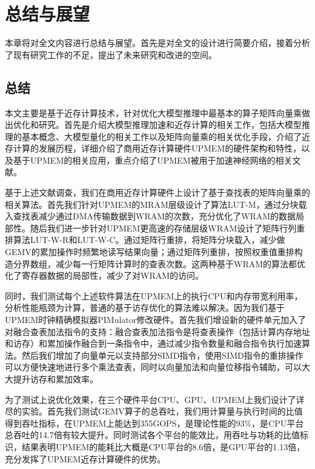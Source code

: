 \chapter{总结与展望}
本章将对全文内容进行总结与展望。首先是对全文的设计进行简要介绍，接着分析了现有研究工作的不足，提出了未来研究和改进的空间。
\section{总结}
本文主要是基于近存计算技术，针对优化大模型推理中最基本的算子矩阵向量乘做出优化和研究。首先是介绍大模型推理加速和近存计算的相关工作，包括大模型推理的基本概念、大模型量化的相关工作以及矩阵向量乘的相关优化手段，介绍了近存计算的发展历程，详细介绍了商用近存计算硬件UPMEM的硬件架构和特性，以及基于UPMEM的相关应用，重点介绍了UPMEM被用于加速神经网络的相关文献。

基于上述文献调查，我们在商用近存计算硬件上设计了基于查找表的矩阵向量乘的相关算法。首先我们针对UPMEM的MRAM层级设计了算法LUT-M，通过分块载入查找表减少通过DMA传输数据到WRAM的次数，充分优化了WRAM的数据局部性。随后我们进一步针对UPMEM更高速的存储层级WRAM设计了矩阵行列重排算法LUT-W-R和LUT-W-C。通过矩阵行重排，将矩阵分块载入，减少做GEMV的累加操作时频繁地读写结果向量；通过矩阵列重排，按照权重值重排构造分界数组，减少每一行矩阵计算时的查表次数。这两种基于WRAM的算法都优化了寄存器数据的局部性，减少了对WRAM的访问。

同时，我们测试每个上述软件算法在UPMEM上的执行CPU和内存带宽利用率，分析性能瓶颈为计算，普通的基于访存优化的算法难以解决。因为我们基于UPMEM时钟精确模拟器PIMulator修改硬件。首先我们增设新的硬件单元加入了对融合查表加法指令的支持：融合查表加法指令是将查表操作（包括计算内存地址和访存）和累加操作融合到一条指令中，通过减少指令数量和融合指令执行加速算法。然后我们增加了向量单元以支持部分SIMD指令，使用SIMD指令的重排操作可以方便快速地进行多个乘法查表，同时以向量加法和向量位移指令辅助，可以大大提升访存和累加效率。

为了测试上说优化效果，在三个硬件平台CPU、GPU、UPMEM上我们设计了详尽的实验。首先我们测试GEMV算子的总吞吐，我们用计算量与执行时间的比值得到吞吐指标，在UPMEM上能达到355GOPS，是理论性能的93\%，是CPU平台总吞吐的14.7倍有较大提升。同时测试各个平台的能效比，用吞吐与功耗的比值标识，结果表明UPMEM的能耗比大概是CPU平台的8.6倍，是GPU平台的1.13倍，充分发挥了UPMEM近存计算硬件的优势。


